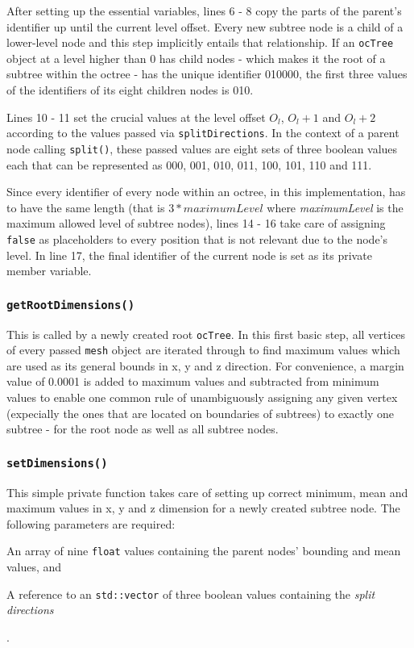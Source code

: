 After setting up the essential variables, lines 6 - 8 copy the parts of the parent's identifier up until the current level offset. Every new subtree node is a child of a lower-level node and this step implicitly entails that relationship. If an \texttt{ocTree} object at a level higher than 0 has child nodes - which makes it the root of a subtree within the octree - has the unique identifier 010000, the first three values of the identifiers of its eight children nodes is 010.

Lines 10 - 11 set the crucial values at the level offset $O_l$, $O_l+1$ and $O_l+2$ according to the values passed via \texttt{splitDirections}. In the context of a parent node calling \texttt{split()}, these passed values are eight sets of three boolean values each that can be represented as 000, 001, 010, 011, 100, 101, 110 and 111.

Since every identifier of every node within an octree, in this implementation, has to have the same length (that is $3*maximumLevel$ where \textit{maximumLevel} is the maximum allowed level of subtree nodes), lines 14 - 16 take care of assigning \texttt{false} as placeholders to every position that is not relevant due to the node's level. In line 17, the final identifier of the current node is set as its private member variable.

	\subsubsection{\texttt{getRootDimensions()}}
	\label{sec:getRootDimensions}
This is called by a newly created root \texttt{ocTree}. In this first basic step, all vertices of every passed \texttt{mesh} object are iterated through to find maximum values which are used as its general bounds in x, y and z direction. For convenience, a margin value of 0.0001 is added to maximum values and subtracted from minimum values to enable one common rule of unambiguously assigning any given vertex (expecially the ones that are located on boundaries of subtrees) to exactly one subtree - for the root node as well as all subtree nodes.

	\subsubsection{\texttt{setDimensions()}}
	\label{sec:setDimensions}
	\label{sec:setDimensions}
This simple private function takes care of setting up correct minimum, mean and maximum values in x, y and z dimension for a newly created subtree node. The following parameters are required:
\begin{enumerate*}
	\item An array of nine \texttt{float} values containing the parent nodes' bounding and mean values, and
	\item A reference to an \texttt{std::vector} of three boolean values containing the \textit{split directions}
\end{enumerate*}.

